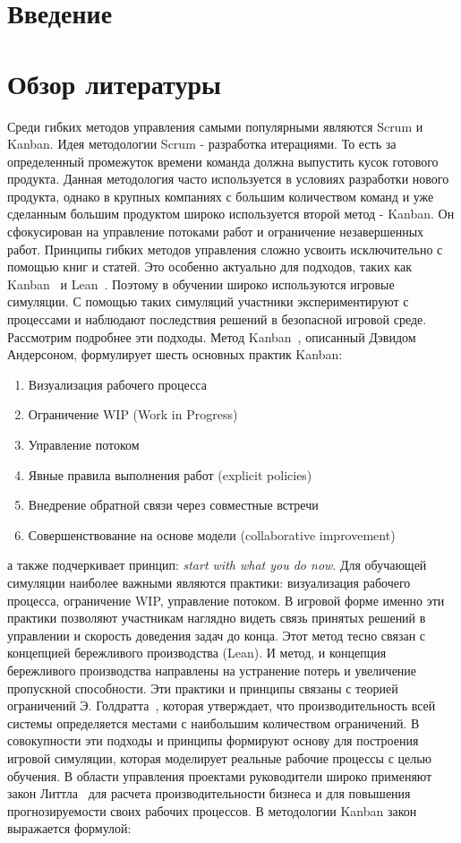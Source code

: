 \documentclass[a4paper,12pt]{extarticle}
\begin{document}
\section{Введение}

\section{Обзор литературы}
Среди гибких методов управления самыми популярными являются Scrum и Kanban. Идея методологии Scrum - разработка итерациями. То есть за определенный промежуток времени команда должна выпустить кусок готового продукта. Данная методология часто используется в условиях разработки нового продукта, однако в крупных компаниях с большим количеством команд и уже сделанным большим продуктом широко используется второй метод - Kanban. Он сфокусирован на управление потоками работ и ограничение незавершенных работ.
Принципы гибких методов управления сложно усвоить исключительно с помощью книг и статей. Это особенно актуально для подходов, таких как Kanban~\cite{kanban-book-bor} и Lean~\cite{lean-book}. Поэтому в обучении широко используются игровые симуляции. С помощью таких симуляций участники экспериментируют с процессами и наблюдают последствия решений в безопасной игровой среде. Рассмотрим подробнее эти подходы. Метод Kanban~\cite{kanban-book-and}, описанный Дэвидом Андерсоном, формулирует шесть основных практик Kanban:
\begin{enumerate}
    \item Визуализация рабочего процесса
    \item Ограничение WIP (Work in Progress)
    \item Управление потоком
    \item Явные правила выполнения работ (explicit policies)
    \item Внедрение обратной связи через совместные встречи
    \item Совершенствование на основе модели (collaborative improvement)
\end{enumerate}
а также подчеркивает принцип: \textit{start with what you do now}. Для обучающей симуляции наиболее важными являются практики: визуализация рабочего процесса, ограничение WIP, управление потоком. В игровой форме именно эти практики позволяют участникам наглядно видеть связь принятых решений в управлении и скорость доведения задач до конца. Этот метод тесно связан с концепцией бережливого производства (Lean). И метод, и концепция бережливого производства направлены на устранение потерь и увеличение пропускной способности. Эти практики и принципы связаны с теорией ограничений Э. Голдратта~\cite{gold-goal-book}, которая утверждает, что производительность всей системы определяется местами с наибольшим количеством ограничений. В совокупности эти подходы и принципы формируют основу для построения игровой симуляции, которая моделирует реальные рабочие процессы с целью обучения. В области управления проектами руководители широко применяют закон Литтла~\cite{little-law} для расчета производительности бизнеса и для повышения прогнозируемости своих рабочих процессов. В методологии Kanban закон выражается формулой:
\end{document}
